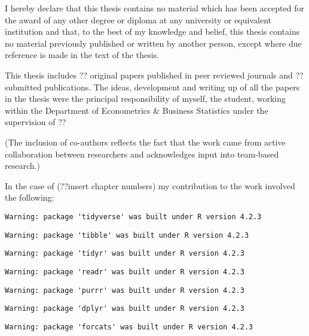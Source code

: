 \documentclass{uniexeterthesis}
\begin{document}

I hereby declare that this thesis contains no material which has been
accepted for the award of any other degree or diploma at any university
or equivalent institution and that, to the best of my knowledge and
belief, this thesis contains no material previously published or written
by another person, except where due reference is made in the text of the
thesis.

This thesis includes ?? original papers published in peer reviewed
journals and ?? submitted publications. The ideas, development and
writing up of all the papers in the thesis were the principal
responsibility of myself, the student, working within the Department of
Econometrics \& Business Statistics under the supervision of ??

(The inclusion of co-authors reflects the fact that the work came from
active collaboration between researchers and acknowledges input into
team-based research.)

In the case of (??insert chapter numbers) my contribution to the work
involved the following:

\begin{verbatim}
Warning: package 'tidyverse' was built under R version 4.2.3
\end{verbatim}

\begin{verbatim}
Warning: package 'tibble' was built under R version 4.2.3
\end{verbatim}

\begin{verbatim}
Warning: package 'tidyr' was built under R version 4.2.3
\end{verbatim}

\begin{verbatim}
Warning: package 'readr' was built under R version 4.2.3
\end{verbatim}

\begin{verbatim}
Warning: package 'purrr' was built under R version 4.2.3
\end{verbatim}

\begin{verbatim}
Warning: package 'dplyr' was built under R version 4.2.3
\end{verbatim}

\begin{verbatim}
Warning: package 'forcats' was built under R version 4.2.3
\end{verbatim}
\end{document}
